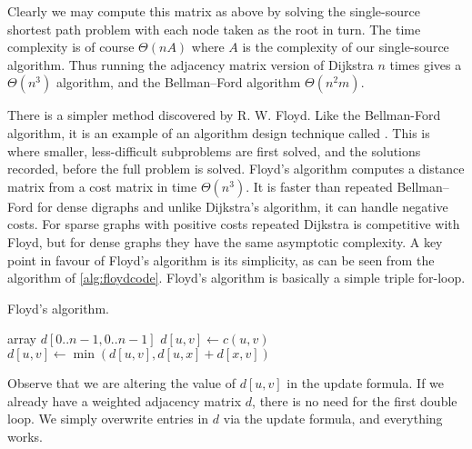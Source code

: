 Clearly we may compute this matrix as above by solving the single-source
shortest path problem with each node taken as the root in turn. The time
complexity is of course $\Theta(nA)$ where $A$ is the complexity of our
single-source algorithm. Thus running the adjacency matrix version of
Dijkstra $n$ times gives a $\Theta(n^3)$ algorithm, and the 
Bellman--Ford algorithm $\Theta(n^2 m)$.

There is a simpler method discovered by R. W. Floyd. Like the Bellman-Ford 
algorithm, it is an example of an algorithm design technique called 
.
This is where smaller, less-difficult subproblems are first solved, and the 
solutions recorded, before
the full problem is solved. Floyd's algorithm computes a distance matrix
from a cost matrix in time $\Theta(n^3)$. It is faster than repeated
Bellman--Ford for dense digraphs and unlike Dijkstra's algorithm,
it can handle negative costs. For sparse graphs with positive costs
repeated Dijkstra is competitive with Floyd, but for dense graphs they
have the same asymptotic complexity. A key point in favour of Floyd's
algorithm is its simplicity, as can be seen from the algorithm of
\cref{alg:floydcode}. Floyd's algorithm is basically a simple
triple for-loop.

\begin{algorithm}[H]
  \caption{Floyd's algorithm.}
  \label{alg:floydcode}
\begin{algorithmic}[1]
	\State array $d[0..n-1,0..n-1]$
			\State $d[u, v] \gets c(u, v)$
		\EndFor 
	\EndFor
				\State $d[u,v] \gets \min( d[u,v], d[u,x] + d[x,v] )$
			\EndFor
		\EndFor
	\EndFor
	\State {}
\EndFunction
\end{algorithmic}
\end{algorithm}


\begin{note}
Observe that we are altering the value of $d[u, v]$ in the update
formula. If we already have a weighted adjacency matrix $d$, there is
no need for the first double loop. We simply overwrite entries in $d$
via the update formula, and everything works.
\end{note}

